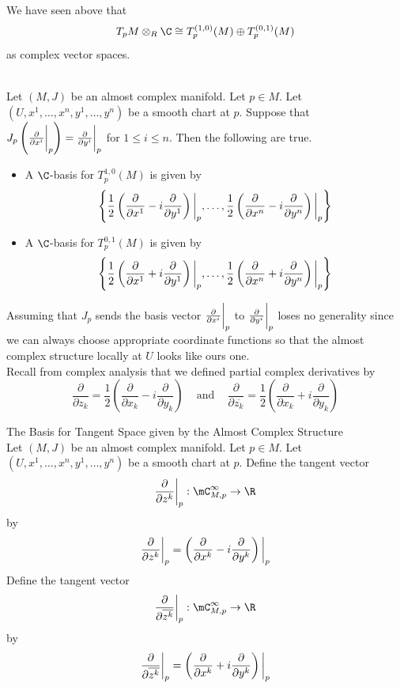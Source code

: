 \documentclass[a4paper]{article}
\begin{document}
We have seen above that $$T_pM\otimes_R\C\cong T_p^{(1,0)}(M)\oplus T_p^{(0,1)}(M)$$ as complex vector spaces. 

\begin{lmm}{}{}\\
Let $(M,J)$ be an almost complex manifold. Let $p\in M$. Let $(U,x^1,\dots,x^n,y^1,\dots,y^n)$ be a smooth chart at $p$. Suppose that $J_p\left(\frac{\partial}{\partial x^i}\bigg{|}_p\right)=\frac{\partial}{\partial y^i}\bigg{|}_p$ for $1\leq i\leq n$. Then the following are true. 
\begin{itemize}
\item A $\C$-basis for $T_p^{1,0}(M)$ is given by $$\left\{\frac{1}{2}\left(\frac{\partial}{\partial x^1}-i\frac{\partial}{\partial y^1}\right)\bigg{|}_p,\dots,\frac{1}{2}\left(\frac{\partial}{\partial x^n}-i\frac{\partial}{\partial y^n}\right)\bigg{|}_p\right\}$$
\item A $\C$-basis for $T_p^{0,1}(M)$ is given by $$\left\{\frac{1}{2}\left(\frac{\partial}{\partial x^1}+i\frac{\partial}{\partial y^1}\right)\bigg{|}_p,\dots,\frac{1}{2}\left(\frac{\partial}{\partial x^n}+i\frac{\partial}{\partial y^n}\right)\bigg{|}_p\right\}$$
\end{itemize}
\end{lmm}

Assuming that $J_p$ sends the basis vector $\frac{\partial}{\partial x^i}\bigg{|}_p$ to $\frac{\partial}{\partial y^i}\bigg{|}_p$ loses no generality since we can always choose appropriate coordinate functions so that the almost complex structure locally at $U$ looks like ours one. \\

Recall from complex analysis that we defined partial complex derivatives by $$\frac{\partial}{\partial z_k}=\frac{1}{2}\left(\frac{\partial}{\partial x_k}-i\frac{\partial}{\partial y_k}\right)\;\;\;\text{ and }\;\;\;\frac{\partial}{\partial\overline{z_k}}=\frac{1}{2}\left(\frac{\partial}{\partial x_k}+i\frac{\partial}{\partial y_k}\right)$$

\begin{defn}{The Basis for Tangent Space given by the Almost Complex Structure}{}\\
Let $(M,J)$ be an almost complex manifold. Let $p\in M$. Let $(U,x^1,\dots,x^n,y^1,\dots,y^n)$ be a smooth chart at $p$. Define the tangent vector $$\frac{\partial}{\partial z^k}\bigg{|}_p:\mC_{M,p}^\infty\to\R$$ by $$\frac{\partial}{\partial z^k}\bigg{|}_p=\left(\frac{\partial}{\partial x^k}-i\frac{\partial}{\partial y^k}\right)\bigg{|}_p$$ Define the tangent vector $$\frac{\partial}{\partial\overline{z^k}}\bigg{|}_p:\mC_{M,p}^\infty\to\R$$ by $$\frac{\partial}{\partial\overline{z^k}}\bigg{|}_p=\left(\frac{\partial}{\partial x^k}+i\frac{\partial}{\partial y^k}\right)\bigg{|}_p$$
\end{defn}
\end{document}
